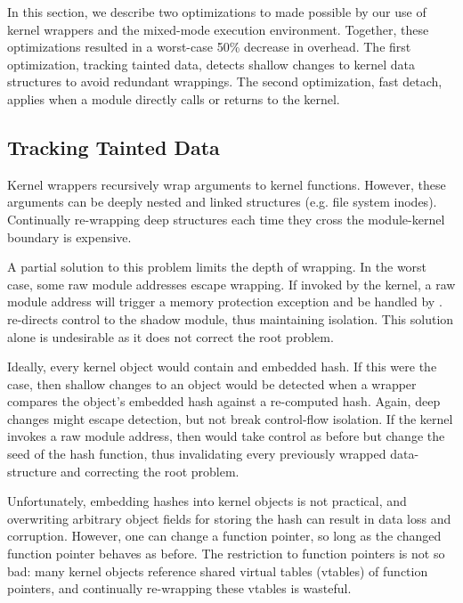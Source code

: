 \documentclass[10pt,preprint]{sigplanconf}
\begin{document}
In this section, we describe two optimizations to {\sysname} made possible by our use of kernel wrappers and the mixed-mode execution environment. Together, these optimizations resulted in a worst-case 50\% decrease in overhead. The first optimization, tracking tainted data, detects shallow changes to kernel data structures to avoid redundant wrappings. The second optimization, fast detach, applies when a module directly calls or returns to the kernel.


\subsection{Tracking Tainted Data \label{sec:tainted_data}}

Kernel wrappers recursively wrap arguments to kernel functions. However, these arguments can be deeply nested and linked structures (e.g. file system inodes). Continually re-wrapping deep structures each time they cross the module-kernel boundary is expensive.

A partial solution to this problem limits the depth of wrapping. In the worst case, some raw module addresses escape wrapping. If invoked by the kernel, a raw module address will trigger a memory protection exception and be handled by {\sysname}. {\Sysname} re-directs control to the shadow module, thus maintaining isolation. This solution alone is undesirable as it does not correct the root problem.

Ideally, every kernel object would contain and embedded hash. If this were the case, then shallow changes to an object would be detected when a wrapper compares the object's embedded hash against a re-computed hash. Again, deep changes might escape detection, but not break control-flow isolation. If the kernel invokes a raw module address, then {\sysname} would take control as before but change the seed of the hash function, thus invalidating every previously wrapped data-structure and correcting the root problem.

Unfortunately, embedding hashes into kernel objects is not practical, and overwriting arbitrary object fields for storing the hash can result in data loss and corruption. However, one can change a function pointer, so long as the changed function pointer behaves as before. The restriction to function pointers is not so bad: many kernel objects reference shared virtual tables (vtables) of function pointers, and continually re-wrapping these vtables is wasteful.
\end{document}
